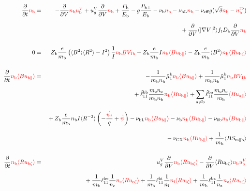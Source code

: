 \documentclass[11pt]{article}
\def\r#1{{\rm#1}}
\def\aves#1{\langle#1\rangle}
\def\para{\parallel}
\def\ddV{\frac{\partial}{\partial V}}
\def\ddt{\frac{\partial}{\partial t}}
\def\psid{\dot{\psi}}
\def\psit{\psi_t}
\def\psitd{\dot{\psit}}
\def\me{m_\r{e}}
\def\mb{m_\r{b}}
\def\nee{n_\r{e}}
\def\ni{n_\r{i}}
\def\nz{n_\r{z}}
\def\nb{n_\r{b}}
\def\Zb{Z_\r{b}}
\def\uzt#1{u_{\r{#1}\zeta}}
\def\upara#1{u_{\r{#1}\para}}
\def\uV#1{u_\r{#1}^V}
\def\ugV{u_{g}^V}
\def\chis#1{\chi_\r{#1}}
\def\nun#1{\nu_\r{0#1}}
\def\nbrp{n_\r{b}^\r{rp}}
\def\Db{D_\r{b}}
\def\bri{\aves{B^2}\aves{R^2} - I^2}
\def\Pbpara{P_{\r{b}\parallel}}
\def\Pbperp{P_{\r{b}\perp}}
\def\Pb{P_\r{b}}
\def\Eb{E_\r{b}}
\def\nueff{\nu_\r{eff}}
\def\nuCX{\nu_\r{CX}}
\def\nub{\nu_\r{b}}
\def\nubL{\nu_\r{bL}}
\def\red#1{\textcolor{red}{#1}}
\begin{document}
%
\begin{eqnarray}
  \ddt \red{\nb} &=&
%
  - \ddV \red{\nb\uV{b}}
%
  + \ugV \ddV \red{\nb}
%
  +  \frac{\Pb}{\Eb}
%
  - g \frac{\Pbperp}{\Eb}
%
  - \nub \red{\nb}
%
  - \nubL \red{\nb}
%
  - \nueff g (\sqrt{\delta} \red{\nb} - \red{\nbrp})
%
\nonumber\\[2.5mm]&&{}
  + \ddV \aves{|\nabla V|^2} f_t \Db \ddV \red{\nb}
%
\\[5mm]
  0 &=&
%
    \Zb \frac{e}{\mb} \left( \bri \right) \frac{1}{I} \red{\nb B V_{1\r{b}}}
%
  + \Zb \frac{e}{\mb} I \red{\nb \aves{B\upara{b}}}
%
  - \Zb \frac{e}{\mb} \aves{B^2} \red{\nb \aves{R\uzt{b}}}
\\[5mm]
  \ddt \red{\nb \aves{B \upara{b}}} &=&
%
  - \frac{1}{\mb \nb} \hat{\mu}_1^\r{b} \red{\nb \aves{B \upara{b}}}
%
  + \frac{1}{\mb \nb} \hat{\mu}_1^\r{b} \red{\nb B V_{1\r{b}}}
\nonumber\\[2.5mm]&&{}
%
  + \hat{\ell}_{11}^\r{bb} \frac{\me\nee}{\mb\nb} \red{\nb \aves{B \upara{b}}}
%
  + \sum_{a\neq\r{b}} \hat{\ell}_{11}^{\r{b}a} \frac{\me\nee}{\mb} \red{\aves{B u_{a\para}}}
\nonumber\\[2.5mm]&&{}
%
  + \Zb \frac{e}{\mb} \nb I \aves{R^{-2}} \left( - \frac{\red{\psitd}}{q} + \red{\psid} \right)
%
  - \nubL \red{\nb \aves{B\upara{b}}}
%
  - \nub  \red{\nb \aves{B\upara{b}}}
%
  - \nun{b} \red{\nb \aves{B\upara{b}}}
\nonumber\\[2.5mm]&&{}
%
  - \nuCX \red{\nb \aves{B\upara{b}}}
%
%
  + \frac{1}{\mb} \aves{B S_{\r{m}\para\r{b}}}
%
\\[5mm]
  \ddt \red{\nb \aves{R \uzt{b}}} &=&
%
  \ugV \ddV \red{\nb \aves{R \uzt{b}}}
%
  - \ddV \aves{R \uzt{b}} \red{\nb \uV{b}} 
%
\nonumber\\[2.5mm]&&{}
%
  + \frac{1}{\mb} \ell_{11}^\r{be} \frac{1}{\nee} \red{\nee \aves{R \uzt{e}}}
  + \frac{1}{\mb} \ell_{11}^\r{bi} \frac{1}{\ni}  \red{\ni  \aves{R \uzt{i}}}
  + \frac{1}{\mb} \ell_{11}^\r{bz} \frac{1}{\nz}  \red{\nz  \aves{R \uzt{z}}}

\end{eqnarray}
\end{document}
